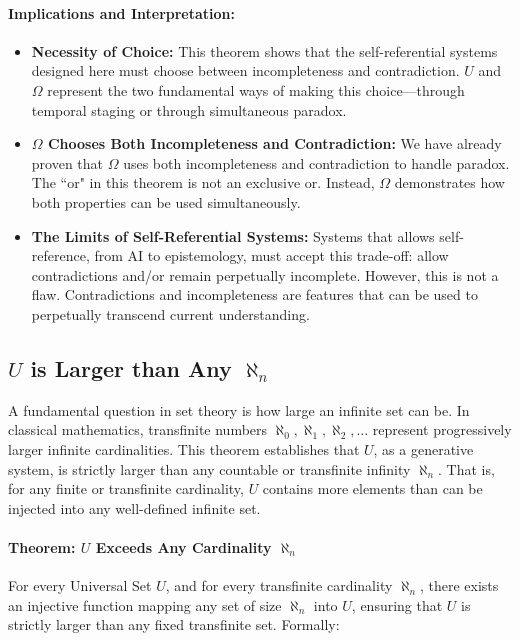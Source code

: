 \documentclass[12pt]{article}
\begin{document}
\paragraph{Implications and Interpretation:}
\begin{itemize}
    \item \textbf{Necessity of Choice:} This theorem shows that the self-referential systems designed here must choose between incompleteness and contradiction. \( U \) and \( \Omega \) represent the two fundamental ways of making this choice—through temporal staging or through simultaneous paradox.
    \item \textbf{\( \Omega \) Chooses Both Incompleteness and Contradiction:} We have already proven that \( \Omega \) uses both incompleteness and contradiction to handle paradox. The ``or" in this theorem is not an exclusive or. Instead, \( \Omega \) demonstrates how both properties can be used simultaneously.
    \item \textbf{The Limits of Self-Referential Systems:} Systems that allows self-reference, from AI to epistemology, must accept this trade-off: allow contradictions and/or remain perpetually incomplete. However, this is not a flaw. Contradictions and incompleteness are features that can be used to perpetually transcend current understanding.
\end{itemize}


\subsection{\( U \) is Larger than Any \( \aleph_n \)}

A fundamental question in set theory is how large an infinite set can be. In classical mathematics, transfinite numbers \( \aleph_0, \aleph_1, \aleph_2, \dots \) represent progressively larger infinite cardinalities. This theorem establishes that \( U \), as a generative system, is strictly larger than any countable or transfinite infinity \( \aleph_n \). That is, for any finite or transfinite cardinality, \( U \) contains more elements than can be injected into any well-defined infinite set.

\paragraph{Theorem: \( U \) Exceeds Any Cardinality \( \aleph_n \)}
For every Universal Set \( U \), and for every transfinite cardinality \( \aleph_n \), there exists an injective function mapping any set of size \( \aleph_n \) into \( U \), ensuring that \( U \) is strictly larger than any fixed transfinite set. Formally:
\end{document}
